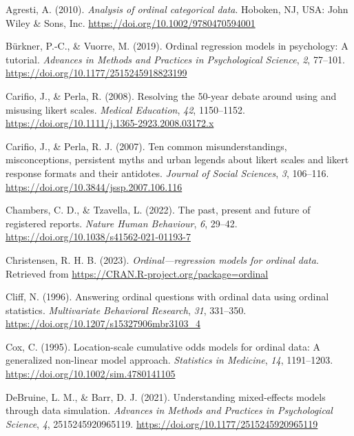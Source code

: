 \documentclass[
  man,floatsintext]{apa6}
\newlength{\cslhangindent}
\newenvironment{CSLReferences}[2] %
 {\begin{list}{}{%
  \setlength{\itemindent}{0pt}
  \setlength{\leftmargin}{0pt}
  \setlength{\parsep}{0pt}
  \ifodd #1
   \setlength{\leftmargin}{\cslhangindent}
   \setlength{\itemindent}{-1\cslhangindent}
  \fi
  \setlength{\itemsep}{#2\baselineskip}}}
 {\end{list}}
\begin{document}
\label{refs}
\begin{CSLReferences}{1}{0}
Agresti, A. (2010). \emph{Analysis of ordinal categorical data}. Hoboken, NJ, USA: John Wiley \& Sons, Inc. \url{https://doi.org/10.1002/9780470594001}

Bürkner, P.-C., \& Vuorre, M. (2019). Ordinal regression models in psychology: A tutorial. \emph{Advances in Methods and Practices in Psychological Science}, \emph{2}, 77--101. \url{https://doi.org/10.1177/2515245918823199}

Carifio, J., \& Perla, R. (2008). Resolving the 50-year debate around using and misusing likert scales. \emph{Medical Education}, \emph{42}, 1150--1152. \url{https://doi.org/10.1111/j.1365-2923.2008.03172.x}

Carifio, J., \& Perla, R. J. (2007). Ten common misunderstandings, misconceptions, persistent myths and urban legends about likert scales and likert response formats and their antidotes. \emph{Journal of Social Sciences}, \emph{3}, 106--116. \url{https://doi.org/10.3844/jssp.2007.106.116}

Chambers, C. D., \& Tzavella, L. (2022). The past, present and future of registered reports. \emph{Nature Human Behaviour}, \emph{6}, 29--42. \url{https://doi.org/10.1038/s41562-021-01193-7}

Christensen, R. H. B. (2023). \emph{Ordinal---regression models for ordinal data}. Retrieved from \url{https://CRAN.R-project.org/package=ordinal}

Cliff, N. (1996). Answering ordinal questions with ordinal data using ordinal statistics. \emph{Multivariate Behavioral Research}, \emph{31}, 331--350. \url{https://doi.org/10.1207/s15327906mbr3103_4}

Cox, C. (1995). Location-scale cumulative odds models for ordinal data: A generalized non-linear model approach. \emph{Statistics in Medicine}, \emph{14}, 1191--1203. \url{https://doi.org/10.1002/sim.4780141105}

DeBruine, L. M., \& Barr, D. J. (2021). Understanding mixed-effects models through data simulation. \emph{Advances in Methods and Practices in Psychological Science}, \emph{4}, 2515245920965119. \url{https://doi.org/10.1177/2515245920965119}


\end{CSLReferences}
\end{document}
